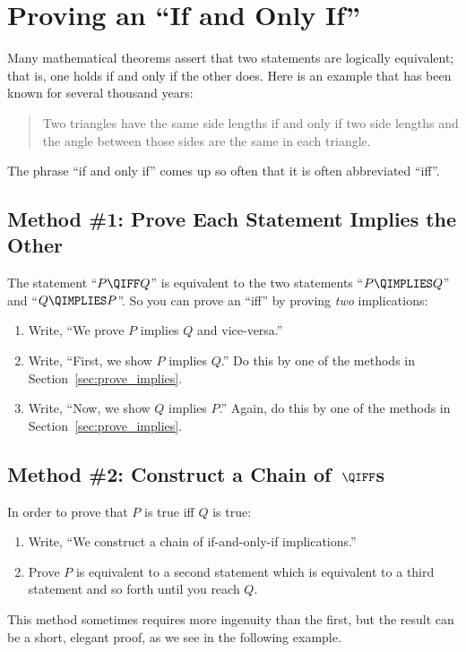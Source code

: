 \section{Proving an ``If and Only If''}\label{sec:prove_iff}

Many mathematical theorems assert that two statements are logically
equivalent; that is, one holds if and only if the other does.  Here is an
example that has been known for several thousand years:
\begin{quote}
Two triangles have the same side lengths if and only if two
side lengths and the angle between those sides are the same in each
triangle.
\end{quote}

The phrase ``if and only if'' comes up so often that it is often
abbreviated ``iff''.

\subsection{Method \#1:  Prove Each Statement Implies the Other}

The statement ``$P \QIFF Q$'' is equivalent to the two statements ``$P
\QIMPLIES Q$'' and ``$Q \QIMPLIES P$''.  So you can prove an ``iff'' by
proving \textit{two} implications:
%
\begin{enumerate}
\item Write, ``We prove $P$ implies $Q$ and vice-versa.''
\item Write, ``First, we show $P$ implies $Q$.'' Do this by one
of the methods in Section~\ref{sec:prove_implies}.
\item Write, ``Now, we show $Q$ implies $P$.''  Again, do this by
one of the methods in Section~\ref{sec:prove_implies}.
\end{enumerate}

\subsection{Method \#2: Construct a Chain of~$\QIFF$s}

In order to prove that $P$ is true iff $Q$ is true:
%
\begin{enumerate}
\item Write, ``We construct a chain of if-and-only-if implications.''
\item Prove $P$ is equivalent to a second statement which is
equivalent to a third statement and so forth until you reach $Q$.
\end{enumerate}
%
This method sometimes requires more ingenuity than the first, but the
result can be a short, elegant proof, as we see in the following
example.

